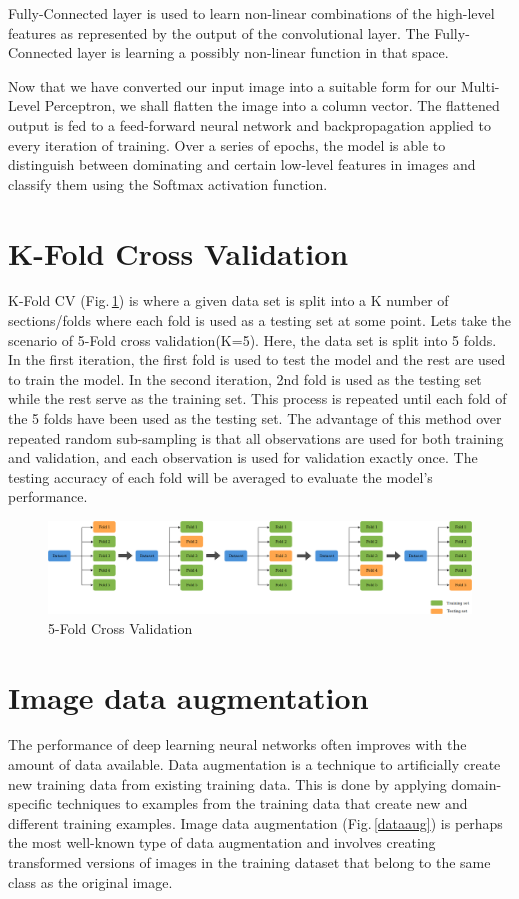 Fully-Connected layer is used to learn non-linear combinations of the high-level features as represented by the output of the convolutional layer. The Fully-Connected layer is learning a possibly non-linear function in that space.

Now that we have converted our input image into a suitable form for our Multi-Level Perceptron, we shall flatten the image into a column vector. The flattened output is fed to a feed-forward neural network and backpropagation applied to every iteration of training. Over a series of epochs, the model is able to distinguish between dominating and certain low-level features in images and classify them using the Softmax activation function.

\section{K-Fold Cross Validation}
K-Fold CV (Fig.\,\ref{kfold}) is where a given data set is split into a K number of sections/folds where each fold is used as a testing set at some point. Lets take the scenario of 5-Fold cross validation(K=5). Here, the data set is split into 5 folds. In the first iteration, the first fold is used to test the model and the rest are used to train the model. In the second iteration, 2nd fold is used as the testing set while the rest serve as the training set. This process is repeated until each fold of the 5 folds have been used as the testing set. The advantage of this method over repeated random sub-sampling is that all observations are used for both training and validation, and each observation is used for validation exactly once. The testing accuracy of each fold will be averaged to evaluate the model's performance. 

\begin{figure}[h]
	\centering
	\includegraphics[width=\textwidth]{Figs/kfold.png}
    \caption{5-Fold Cross Validation}
    \label{kfold}
\end{figure}


\section{Image data augmentation}
The performance of deep learning neural networks often improves with the amount of data available. Data augmentation is a technique to artificially create new training data from existing training data. This is done by applying domain-specific techniques to examples from the training data that create new and different training examples.
Image data augmentation (Fig.\,\ref{dataaug}) is perhaps the most well-known type of data augmentation and involves creating transformed versions of images in the training dataset that belong to the same class as the original image.

